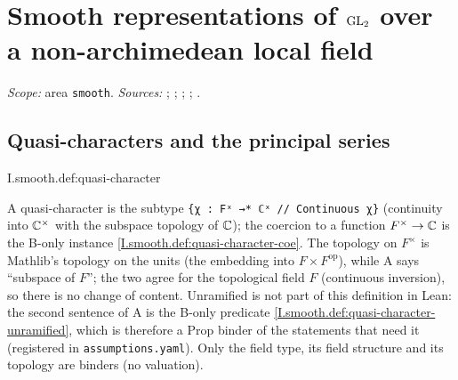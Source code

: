 \chapter{\texorpdfstring{Smooth representations of $\mathrm{GL}_2$ over a non-archimedean local field}{Smooth representations of GL₂ over a non-archimedean local field}}\label{ch:ch-1-02-smooth}

\noindent\emph{Scope:} area \texttt{smooth}. \emph{Sources:} \cite[§§2--4]{JL};
\cite[§§3--7, §9]{Cas-p}; \cite{Bern}; \cite{BZ}; \cite{A-SC}.

\section{Quasi-characters and the principal series}

\begin{definition}
\end{definition}
\begin{tfformal}{I.smooth.def:quasi-character}
\begin{tffidelity}
A quasi-character is the subtype \texttt{\{χ : Fˣ →* ℂˣ // Continuous χ\}} (continuity into $\mathbb{C}^\times$ with the subspace topology of $\mathbb{C}$); the coercion to a function $F^\times\to\mathbb{C}$ is the B-only instance \cref{I.smooth.def:quasi-character-coe}. The topology on $F^\times$ is Mathlib's topology on the units (the embedding into $F\times F^{\mathrm{op}}$), while A says ``subspace of $F$''; the two agree for the topological field $F$ (continuous inversion), so there is no change of content. Unramified is not part of this definition in Lean: the second sentence of A is the B-only predicate \cref{I.smooth.def:quasi-character-unramified}, which is therefore a Prop binder of the statements that need it (registered in \texttt{assumptions.yaml}). Only the field type, its field structure and its topology are binders (no valuation).
\end{tffidelity}
\end{tfformal}

